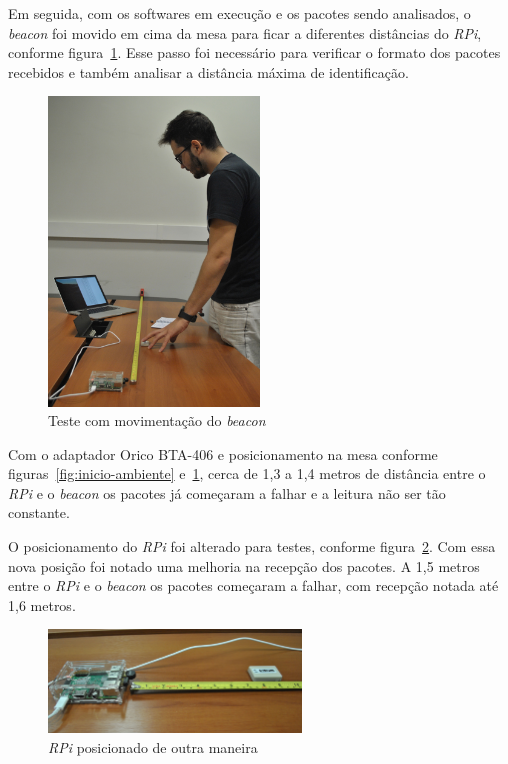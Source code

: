 \documentclass[
		12pt,				%
		openright,			%
		oneside,			%
		a4paper,			%
		chapter=TITLE,		%
		english,			%
		brazil				%
	]{abntex2}
\begin{document}
Em seguida, com os softwares em execução e os pacotes sendo analisados, o \textit{beacon} foi movido em cima da mesa para ficar a diferentes distâncias do \textit{RPi}, conforme figura~\ref{fig:movimenta-beacon}. Esse passo foi necessário para verificar o formato dos pacotes recebidos e também analisar a distância máxima de identificação.

\begin{figure}[htb]
	\caption{\label{fig:movimenta-beacon}Teste com movimentação do \textit{beacon}}
	\begin{center}
		\includegraphics[width=0.5\textwidth]{img/ambiente4.jpg}
	\end{center}
\end{figure}

Com o adaptador Orico BTA-406 e posicionamento na mesa conforme figuras~\ref{fig:inicio-ambiente} e~\ref{fig:movimenta-beacon}, cerca de 1,3 a 1,4 metros de distância entre o \textit{RPi} e o \textit{beacon} os pacotes já começaram a falhar e a leitura não ser tão constante.

O posicionamento do \textit{RPi} foi alterado para testes, conforme figura~\ref{fig:posiciona-rpi}. Com essa nova posição foi notado uma melhoria na recepção dos pacotes. A 1,5 metros entre o \textit{RPi} e o \textit{beacon} os pacotes começaram a falhar, com recepção notada até 1,6 metros.

\begin{figure}[htb]
	\caption{\label{fig:posiciona-rpi}\textit{RPi} posicionado de outra maneira}
	\begin{center}
		\includegraphics[width=0.6\textwidth]{img/ambiente2.jpg}
	\end{center}
\end{figure}
\end{document}
